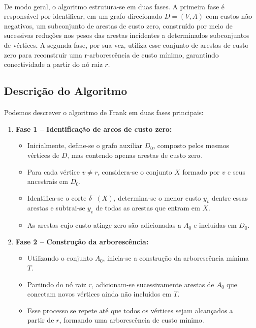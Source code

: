 \documentclass[12pt,a4paper]{article}
\begin{document}
\paragraph{}
De modo geral, o algoritmo estrutura-se em duas fases. A primeira fase é responsável por identificar, em um grafo direcionado $D=(V,A)$ com custos não negativos, um subconjunto de arestas de custo zero, construído por meio de sucessivas reduções nos pesos das arestas incidentes a determinados subconjuntos de vértices. A segunda fase, por sua vez, utiliza esse conjunto de arestas de custo zero para reconstruir uma r-arborescência de custo mínimo, garantindo conectividade a partir do nó raiz $r$.

\subsection{Descrição do Algoritmo}
\paragraph{}
Podemos descrever o algoritmo de Frank em duas fases principais:

\begin{enumerate}
    \item \textbf{Fase 1 – Identificação de arcos de custo zero:}
    \begin{itemize}
        \item Inicialmente, define-se o grafo auxiliar \(D_0\), composto pelos mesmos vértices de \(D\), mas contendo apenas arestas de custo zero.
        \item Para cada vértice \(v \neq r\), considera-se o conjunto \(X\) formado por \(v\) e seus ancestrais em \(D_0\).
        \item Identifica-se o corte \(\delta^-(X)\), determina-se o menor custo \(y_v\) dentre essas arestas e subtrai-se \(y_v\) de todas as arestas que entram em \(X\).
        \item As arestas cujo custo atinge zero são adicionadas a \(A_0\) e incluídas em \(D_0\).
    \end{itemize}

    \item \textbf{Fase 2 – Construção da arborescência:}
    \begin{itemize}
        \item Utilizando o conjunto \(A_0\), inicia-se a construção da arborescência mínima \(T\).
        \item Partindo do nó raiz \(r\), adicionam-se sucessivamente arestas de \(A_0\) que conectam novos vértices ainda não incluídos em \(T\).
        \item Esse processo se repete até que todos os vértices sejam alcançados a partir de \(r\), formando uma arborescência de custo mínimo.
    \end{itemize}
\end{enumerate}
\end{document}
